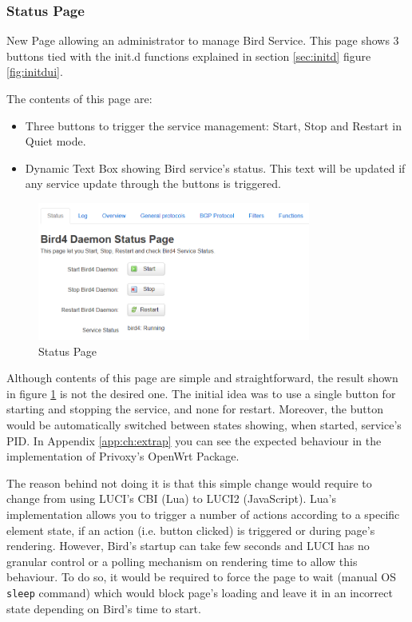 \subsubsection{Status Page}
New Page allowing an administrator to manage Bird Service. This page shows 3 buttons tied with the init.d functions explained in section \ref{sec:initd} figure \ref{fig:initdui}.


The contents of this page are:
\begin{itemize}
    \item Three buttons to trigger the service management: Start, Stop and Restart in Quiet mode.
    \item Dynamic Text Box showing Bird service's status. This text will be updated if any service update through the buttons is triggered.
\end{itemize}

\begin{figure}[H]
    \centering
    \includegraphics[width=0.8\textwidth]{images/bird0.3/status}
    \caption{Status Page}
    \label{fig:statusp}
\end{figure}

Although contents of this page are simple and straightforward, the result shown in figure \ref{fig:statusp} is not the desired one. The initial idea was to use a single button for starting and stopping the service, and none for restart. Moreover, the button would be automatically switched between states showing, when started, service's PID. In Appendix \ref{app:ch:extrap} you can see the expected behaviour in the implementation of Privoxy's OpenWrt Package.

The reason behind not doing it is that this simple change would require to change from using LUCI's CBI (Lua) to LUCI2 (JavaScript). Lua's implementation allows you to trigger a number of actions according to a specific element state, if an action (i.e. button clicked) is triggered or during page's rendering. However, Bird's startup can take few seconds and LUCI has no granular control or a polling mechanism on rendering time to allow this behaviour. To do so, it would be required to force the page to wait (manual OS \texttt{sleep} command) which would block page's loading and leave it in an incorrect state depending on Bird's time to start.

